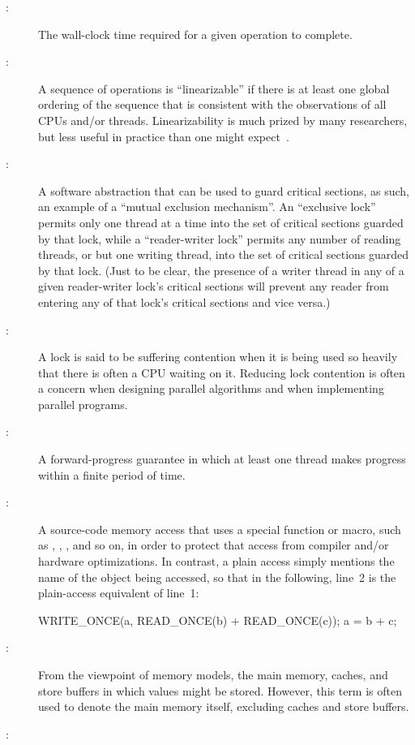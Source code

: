 \begin{description}
\item[:]
	The wall-clock time required for a given operation to complete.
\item[:]
	A sequence of operations is ``linearizable'' if there is at
	least one global ordering of the sequence that is consistent
	with the observations of all CPUs and/or threads.
	Linearizability is much prized by many researchers, but less
	useful in practice than one might
	expect~\cite{AndreasHaas2012FIFOisnt}.
\item[:]
	A software abstraction that can be used to guard critical sections,
	as such, an example of a ``mutual exclusion mechanism''.
	An ``exclusive lock'' permits only one thread at a time into the
	set of critical sections guarded by that lock, while a
	``reader-writer lock'' permits any number of reading
	threads, or but one writing thread, into the set of critical
	sections guarded by that lock.
	(Just to be clear, the presence	of a writer thread in any of
	a given reader-writer lock's critical sections will prevent
	any reader from entering any of that lock's critical sections
	and vice versa.)
\item[:]
	A lock is said to be suffering contention when it is being
	used so heavily that there is often a CPU waiting on it.
	Reducing lock contention is often a concern when designing
	parallel algorithms and when implementing parallel programs.
\item[:]
	A forward-progress guarantee in which at least one thread makes
	progress within a finite period of time.
\item[:]
	A source-code memory access that uses a special function or
	macro, such as , ,
	, and so on, in order to protect that access
	from compiler and/or hardware optimizations.
	In contrast, a plain access simply mentions the name of
	the object being accessed, so that in the following, line~2
	is the plain-access equivalent of line~1:
	\begin{VerbatimN}
	WRITE_ONCE(a, READ_ONCE(b) + READ_ONCE(c));
	a = b + c;
	\end{VerbatimN}
\item[:]
	From the viewpoint of memory models, the main memory,
	caches, and store buffers in which values might be stored.
	However, this term is often used to denote the main memory
	itself, excluding caches and store buffers.
\item[:]

\end{description}
